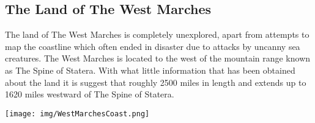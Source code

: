 \begin{onecolumn}
\chapter{The Land of The West Marches}


The land of The West Marches is completely unexplored, apart from attempts to map the coastline which often ended in disaster due to attacks by uncanny sea creatures. The West Marches is located to the west of the mountain range known as The Spine of Statera. With what little information that has been obtained about the land it is suggest that roughly 2500 miles in length and extends up to 1620 miles westward of The Spine of Statera. 
\begin{center}
\texttt{[image: img/WestMarchesCoast.png]}
\end{center}
\end{onecolumn}
\begin{twocolumn}
\end{twocolumn}